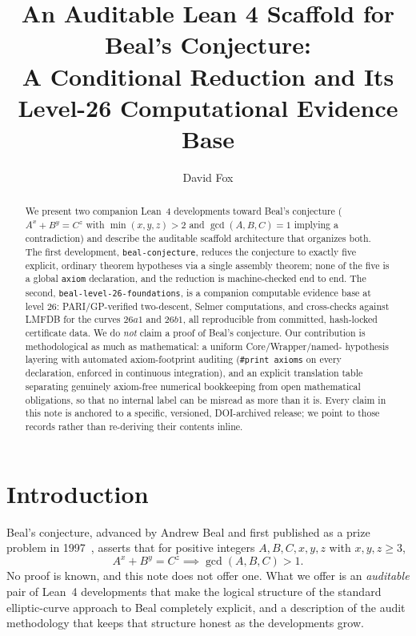 \documentclass{amsart}
\title[An Auditable Scaffold for Beal's Conjecture]
{An Auditable Lean 4 Scaffold for Beal's Conjecture:\\
A Conditional Reduction and Its Level-26 Computational Evidence Base}
\author{David Fox}
\begin{document}
\begin{abstract}
We present two companion Lean~4 developments toward Beal's conjecture
($A^x+B^y=C^z$ with $\min(x,y,z)>2$ and $\gcd(A,B,C)=1$ implying a
contradiction) and describe the auditable scaffold architecture that
organizes both. The first development, \texttt{beal-conjecture}, reduces
the conjecture to exactly five explicit, ordinary theorem hypotheses via
a single assembly theorem; none of the five is a global \texttt{axiom}
declaration, and the reduction is machine-checked end to end. The second,
\texttt{beal-level-26-foundations}, is a companion computable evidence
base at level $26$: PARI/GP-verified two-descent, Selmer computations,
and cross-checks against LMFDB for the curves $26a1$ and $26b1$, all
reproducible from committed, hash-locked certificate data. We do
\emph{not} claim a proof of Beal's conjecture. Our contribution is
methodological as much as mathematical: a uniform Core/Wrapper/named-
hypothesis layering with automated axiom-footprint auditing
(\texttt{\#print axioms} on every declaration, enforced in continuous
integration), and an explicit translation table separating genuinely
axiom-free numerical bookkeeping from open mathematical obligations,
so that no internal label can be misread as more than it is. Every
claim in this note is anchored to a specific, versioned, DOI-archived
release; we point to those records rather than re-deriving their
contents inline.
\end{abstract}

\maketitle

\tableofcontents

\section{Introduction}

Beal's conjecture, advanced by Andrew Beal and first published as a prize
problem in 1997~\cite{beal1997}, asserts that for positive integers
$A,B,C,x,y,z$ with $x,y,z\ge 3$,
\[
A^x+B^y=C^z \implies \gcd(A,B,C)>1.
\]
No proof is known, and this note does not offer one. What we offer is an
\emph{auditable} pair of Lean~4 developments that make the logical
structure of the standard elliptic-curve approach to Beal completely
explicit, and a description of the audit methodology that keeps that
structure honest as the developments grow.
\end{document}
